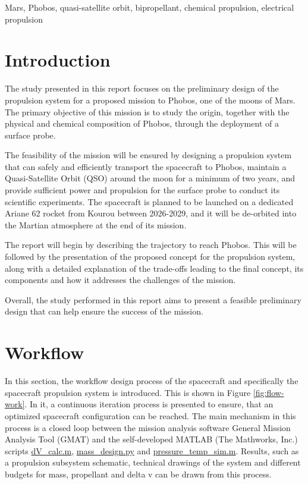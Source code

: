 \documentclass[conference]{IEEEtran}
\begin{document}
\begin{IEEEkeywords}
Mars, Phobos, quasi-satellite orbit, bipropellant, chemical propulsion, electrical propulsion
\end{IEEEkeywords}

\section{Introduction}
The study presented in this report focuses on the preliminary design of the propulsion system for a proposed mission to Phobos, one of the moons of Mars. The primary objective of this mission is to study the origin, together with the physical and chemical composition of Phobos, through the deployment of a surface probe.

The feasibility of the mission will be ensured by designing a propulsion system that can safely and efficiently transport the spacecraft to Phobos, maintain a Quasi-Satellite Orbit (QSO) around the moon for a minimum of two years, and provide sufficient power and propulsion for the surface probe to conduct its scientific experiments. The spacecraft is planned to be launched on a dedicated Ariane 62 rocket from Kourou between 2026-2029, and it will be de-orbited into the Martian atmosphere at the end of its mission.

The report will begin by describing the trajectory to reach Phobos. This will be followed by the presentation of the proposed concept for the propulsion system, along with a detailed explanation of the trade-offs leading to the final concept, its components and how it addresses the challenges of the mission.

Overall, the study performed in this report aims to present a feasible preliminary design that can help ensure the success of the mission.
\newpage

\section{Workflow} 



In this section, the workflow design process of the spacecraft and specifically the spacecraft propulsion system is introduced. This is shown in Figure \ref{fig:flow-work}. In it, a continuous iteration process is presented to ensure, that an optimized spacecraft configuration can be reached. The main mechanism in this process is a closed loop between the mission analysis software General Mission Analysis Tool (GMAT) and the self-developed MATLAB (The Mathworks, Inc.) scripts  \href{https://github.com/Sven-J-Steinert/MomenTUM/blob/main/MATLAB/dV_calc.m}{\colorbox{codegray}{dV\_calc.m}}, \href{https://github.com/Sven-J-Steinert/MomenTUM/blob/main/MATLAB/mass_design.m}{\colorbox{codegray}{mass\_design.py}} and \href{https://github.com/Sven-J-Steinert/MomenTUM/blob/main/MATLAB/pressure_temp_sim.m}{\colorbox{codegray}{pressure\_temp\_sim.m}}. Results, such as a propulsion subsystem schematic, technical drawings of the system and different budgets for mass, propellant and delta v can be drawn from this process.
\end{document}
